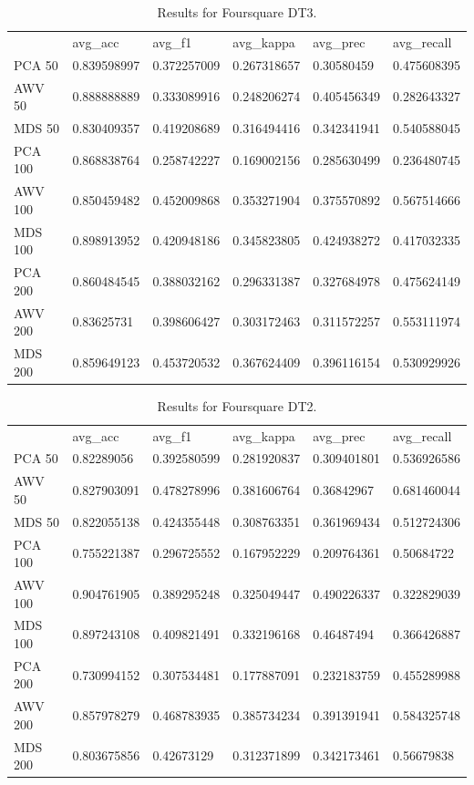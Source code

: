 \begin{table}[]
\begin{tabular}{llllll}
	& avg\_acc    & avg\_f1     & avg\_kappa  & avg\_prec   & avg\_recall \\
	PCA 50  & 0.839598997 & 0.372257009 & 0.267318657 & 0.30580459  & 0.475608395 \\
	AWV 50  & 0.888888889 & 0.333089916 & 0.248206274 & 0.405456349 & 0.282643327 \\
	MDS 50  & 0.830409357 & 0.419208689 & 0.316494416 & 0.342341941 & 0.540588045 \\
	PCA 100 & 0.868838764 & 0.258742227 & 0.169002156 & 0.285630499 & 0.236480745 \\
	AWV 100 & 0.850459482 & 0.452009868 & 0.353271904 & 0.375570892 & 0.567514666 \\
	MDS 100 & 0.898913952 & 0.420948186 & 0.345823805 & 0.424938272 & 0.417032335 \\
	PCA 200 & 0.860484545 & 0.388032162 & 0.296331387 & 0.327684978 & 0.475624149 \\
	AWV 200 & 0.83625731  & 0.398606427 & 0.303172463 & 0.311572257 & 0.553111974 \\
	MDS 200 & 0.859649123 & 0.453720532 & 0.367624409 & 0.396116154 & 0.530929926
\end{tabular}
\caption{Results for Foursquare DT3.}
\label{table:Newsgroups}
\end{table}

\begin{table}[]
\begin{tabular}{llllll}
	& avg\_acc    & avg\_f1     & avg\_kappa  & avg\_prec   & avg\_recall \\
	PCA 50  & 0.82289056  & 0.392580599 & 0.281920837 & 0.309401801 & 0.536926586 \\
	AWV 50  & 0.827903091 & 0.478278996 & 0.381606764 & 0.36842967  & 0.681460044 \\
	MDS 50  & 0.822055138 & 0.424355448 & 0.308763351 & 0.361969434 & 0.512724306 \\
	PCA 100 & 0.755221387 & 0.296725552 & 0.167952229 & 0.209764361 & 0.50684722  \\
	AWV 100 & 0.904761905 & 0.389295248 & 0.325049447 & 0.490226337 & 0.322829039 \\
	MDS 100 & 0.897243108 & 0.409821491 & 0.332196168 & 0.46487494  & 0.366426887 \\
	PCA 200 & 0.730994152 & 0.307534481 & 0.177887091 & 0.232183759 & 0.455289988 \\
	AWV 200 & 0.857978279 & 0.468783935 & 0.385734234 & 0.391391941 & 0.584325748 \\
	MDS 200 & 0.803675856 & 0.42673129  & 0.312371899 & 0.342173461 & 0.56679838 
\end{tabular}
\caption{Results for Foursquare DT2.}
\label{table:Newsgroups}
\end{table}

